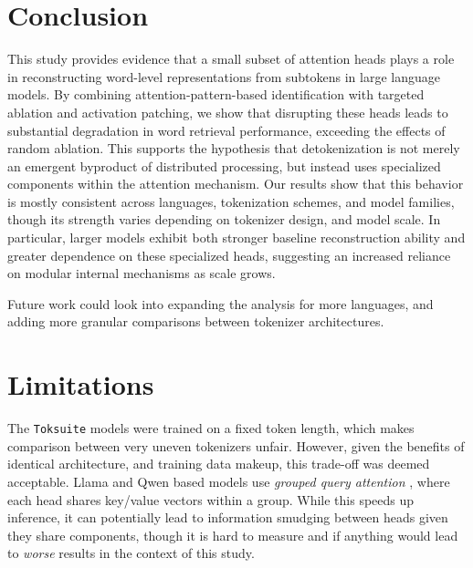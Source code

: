 \documentclass[11pt]{article}
\begin{document}

\section{Conclusion}

This study provides evidence that a small subset of attention heads plays a role in reconstructing word-level representations from subtokens in large language models. By combining attention-pattern-based identification with targeted ablation and activation patching, we show that disrupting these heads leads to substantial degradation in word retrieval performance, exceeding the effects of random ablation. This supports the hypothesis that detokenization is not merely an emergent byproduct of distributed processing, but instead uses specialized components within the attention mechanism. Our results show that this behavior is mostly consistent across languages, tokenization schemes, and model families, though its strength varies depending on tokenizer design, and model scale. In particular, larger models exhibit both stronger baseline reconstruction ability and greater dependence on these specialized heads, suggesting an increased reliance on modular internal mechanisms as scale grows.

Future work could look into expanding the analysis for more languages, and adding more granular comparisons between tokenizer architectures.

\section*{Limitations}

The \texttt{Toksuite} models were trained on a fixed token length, which makes comparison between very uneven tokenizers unfair. However, given the benefits of identical architecture, and training data makeup, this trade-off was deemed acceptable. Llama and Qwen based models use \textit{grouped query attention} \citep{ainslie2023}, where each head shares key/value vectors within a group. While this speeds up inference, it can potentially lead to information smudging between heads given they share components, though it is hard to measure and if anything would lead to \textit{worse} results in the context of this study.

\end{document}
